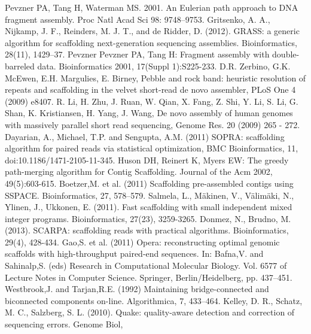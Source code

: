 \documentclass[11pt]{article}
\begin{document}
\begin{thebibliography}{widest entry}
   Pevzner PA, Tang H, Waterman MS. 2001. An
    Eulerian path approach to DNA fragment assembly. Proc Natl Acad Sci 98:
    9748–9753.
   Gritsenko, A. A., Nijkamp, J. F., Reinders, M. J. T.,
    and de Ridder, D. (2012). GRASS: a generic algorithm for scaffolding
    next-generation sequencing assemblies. Bioinformatics, 28(11), 1429–37.
   Pevzner Pevzner PA, Tang H: Fragment assembly with
    double-barreled data. Bioinformatics 2001, 17(Suppl 1):S225-233.
   D.R. Zerbino, G.K. McEwen, E.H. Margulies, E.
    Birney, Pebble and rock band: heuristic resolution of repeats and
    scaffolding in the velvet short-read de novo assembler, PLoS One 4 (2009)
    e8407.
   R. Li, H. Zhu, J. Ruan, W. Qian, X. Fang, Z. Shi, Y. Li,
    S. Li, G. Shan, K. Kristiansen, H. Yang, J. Wang, De novo assembly of
    human genomes with massively parallel short read sequencing, Genome Res. 20
    (2009) 265 - 272.
   Dayarian, A., Michael, T.P. and Sengupta, A.M. (2011) SOPRA:
    scaffolding algorithm for paired reads via statistical optimization, BMC
    Bioinformatics, 11, doi:10.1186/1471-2105-11-345.
   Huson DH, Reinert K, Myers EW: The greedy
    path-merging algorithm for Contig Scaffolding. Journal of the Acm 2002,
    49(5):603-615.
   Boetzer,M. et al. (2011) Scaffolding pre-assembled contigs
    using SSPACE. Bioinformatics, 27, 578–579.
   Salmela, L., Mäkinen, V., Välimäki, N., Ylinen, J., Ukkonen,
    E. (2011). Fast scaffolding with small independent mixed integer programs.
    Bioinformatics, 27(23), 3259-3265.
   Donmez, N., Brudno, M. (2013). SCARPA: scaffolding reads
    with practical algorithms. Bioinformatics, 29(4), 428-434.
   Gao,S. et al. (2011) Opera: reconstructing optimal genomic
    scaffolds with high-throughput paired-end sequences. In: Bafna,V. and
    Sahinalp,S. (eds) Research in Computational Molecular Biology. Vol. 6577 of
    Lecture Notes in Computer Science. Springer, Berlin/Heidelberg, pp. 437–451.
   Westbrook,J. and Tarjan,R.E. (1992) Maintaining
    bridge-connected and biconnected components on-line. Algorithmica, 7,
    433–464.
   Kelley, D. R., Schatz, M. C., Salzberg, S. L. (2010). Quake:
    quality-aware detection and correction of sequencing errors. Genome Biol,

\end{thebibliography}
\end{document}
